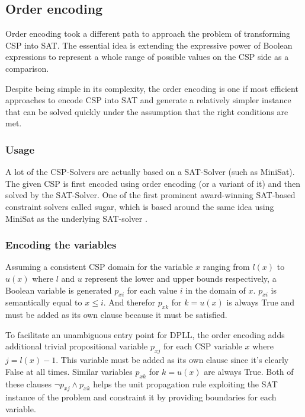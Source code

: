 \subsection{Order encoding}

Order encoding took a different path to approach the problem of transforming CSP into SAT. The essential idea is extending the expressive power of Boolean expressions to represent a whole range of possible values on the CSP side as a comparison.

Despite being simple in its complexity, the order encoding is one if most efficient approaches to encode CSP into SAT and generate a relatively simpler instance that can be solved quickly under the assumption that the right conditions are met.

\subsubsection{Usage}
A lot of the CSP-Solvers are actually based on a SAT-Solver (such as MiniSat). The given CSP is first encoded using order encoding (or a variant of it) and then solved by the SAT-Solver. One of the first prominent award-winning SAT-based constraint solvers called sugar, which is based around the same idea using MiniSat as the underlying SAT-solver \cite{tamura2008sugar}.

\subsubsection{Encoding the variables}
Assuming a consistent CSP domain for the variable $x$ ranging from $l(x)$ to $u(x)$ where $l$ and $u$ represent the lower and upper bounds respectively, a Boolean variable is generated $p_{xi}$ for each value $i$ in the domain of $x$. $p_{xi}$ is semantically equal to $x \leq i$. And therefor $p_{xk}$ for $k = u(x)$ is always True and must be added as its own clause because it must be satisfied.

To facilitate an unambiguous entry point for DPLL, the order encoding adds additional trivial propositional variable  $p_{xj}$ for each CSP  variable $x$ where $j = l(x) - 1$. This variable must be added as its own clause since it's clearly False at all times. Similar variables $p_{xk}$ for  $k = u(x)$ are always True. Both of these clauses $\neg p_{xj} \wedge p_{xk}$ helps the unit propagation rule exploiting the SAT instance of the problem and constraint it by providing boundaries for each variable.

